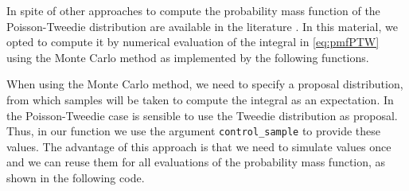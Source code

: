 \documentclass[9pt,a5paper,]{book}
\newenvironment{Shaded}{}{}
\newcommand{\KeywordTok}[1]{\textbf{{#1}}}
\newcommand{\DataTypeTok}[1]{\underline{{#1}}}
\newcommand{\StringTok}[1]{{#1}}
\newcommand{\CommentTok}[1]{\textit{{#1}}}
\newcommand{\NormalTok}[1]{{#1}}
\renewenvironment{Shaded}{\color{inputcolor}}{}
\renewcommand{\DataTypeTok}[1]{{#1}}
\theoremstyle{definition}
\theoremstyle{definition}
\theoremstyle{remark}
\begin{document}
In spite of other approaches to compute the probability mass function of
the Poisson-Tweedie distribution are available in the literature
\citetext{\citealp[ ]{Esnaola2013}; \citealp{Barabesi2016}}. In this
material, we opted to compute it by numerical evaluation of the integral
in \eqref{eq:pmfPTW} using the Monte Carlo method as implemented by the
following functions.

\begin{Shaded}
\end{Shaded}

When using the Monte Carlo method, we need to specify a proposal
distribution, from which samples will be taken to compute the integral
as an expectation. In the Poisson-Tweedie case is sensible to use the
Tweedie distribution as proposal. Thus, in our function we use the
argument \texttt{control\_sample} to provide these values. The advantage
of this approach is that we need to simulate values once and we can
reuse them for all evaluations of the probability mass function, as
shown in the following code.
\end{document}
